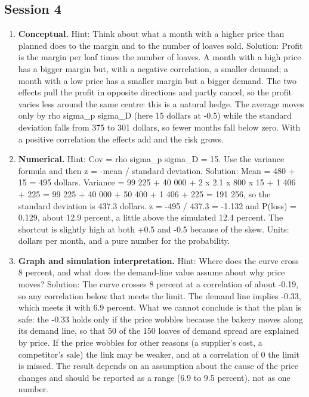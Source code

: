 \documentclass[11pt,a4paper]{article}
\begin{document}
\subsection*{Session 4}
\begin{enumerate}[nosep]
\item \textbf{Conceptual.} Hint: Think about what a month with a higher price than planned does to the margin and to the number of loaves sold. Solution: Profit is the margin per loaf times the number of loaves. A month with a high price has a bigger margin but, with a negative correlation, a smaller demand; a month with a low price has a smaller margin but a bigger demand. The two effects pull the profit in opposite directions and partly cancel, so the profit varies less around the same centre: this is a natural hedge. The average moves only by rho sigma\_p sigma\_D (here 15 dollars at -0.5) while the standard deviation falls from 375 to 301 dollars, so fewer months fall below zero. With a positive correlation the effects add and the risk grows.
\item \textbf{Numerical.} Hint: Cov = rho sigma\_p sigma\_D = 15. Use the variance formula and then z = -mean / standard deviation. Solution: Mean = 480 + 15 = 495 dollars. Variance = 99 225 + 40 000 + 2 x 2.1 x 800 x 15 + 1 406 + 225 = 99 225 + 40 000 + 50 400 + 1 406 + 225 = 191 256, so the standard deviation is 437.3 dollars. z = -495 / 437.3 = -1.132 and P(loss) = 0.129, about 12.9 percent, a little above the simulated 12.4 percent. The shortcut is slightly high at both +0.5 and -0.5 because of the skew. Units: dollars per month, and a pure number for the probability.
\item \textbf{Graph and simulation interpretation.} Hint: Where does the curve cross 8 percent, and what does the demand-line value assume about why price moves? Solution: The curve crosses 8 percent at a correlation of about -0.19, so any correlation below that meets the limit. The demand line implies -0.33, which meets it with 6.9 percent. What we cannot conclude is that the plan is safe: the -0.33 holds only if the price wobbles because the bakery moves along its demand line, so that 50 of the 150 loaves of demand spread are explained by price. If the price wobbles for other reasons (a supplier's cost, a competitor's sale) the link may be weaker, and at a correlation of 0 the limit is missed. The result depends on an assumption about the cause of the price changes and should be reported as a range (6.9 to 9.5 percent), not as one number.

\end{enumerate}
\end{document}
